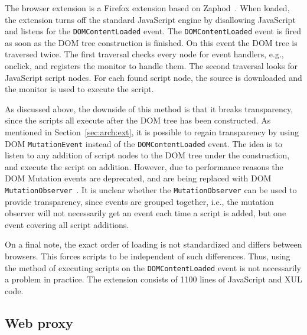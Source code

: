 \documentclass{llncs}
\begin{document}
The browser extension is a Firefox extension based on Zaphod~\cite{Zaphod}.
%
When loaded, the extension turns off the standard JavaScript engine by
disallowing JavaScript and listens for the \lstinline{DOMContentLoaded} event.  The
\lstinline{DOMContentLoaded} event is fired as soon as the DOM tree construction is
finished.  On this event the DOM tree is traversed twice. The first traversal
checks every node for event handlers, e.g., onclick, and registers the monitor
to handle them. The second traversal looks for JavaScript script nodes.  For
each found script node, the source is downloaded and the
monitor is used to execute the script.

As discussed above, the downside of this method is that it breaks
transparency, since the scripts all execute after the DOM
tree has been constructed. As mentioned in Section~\ref{sec:arch:ext}, it is possible to regain transparency by using DOM
\lstinline{MutationEvent} instead of the \lstinline{DOMContentLoaded} event.  The idea is to listen
to any addition of script nodes to the DOM tree under the construction, and
execute the script on addition.  However, due to performance reasons the DOM
Mutation events are deprecated, and are being replaced with DOM \lstinline{MutationObserver}~\cite{DOM4}. 
It is unclear whether the \lstinline{MutationObserver} can be used to
provide transparency, since events are grouped together, i.e., the mutation
observer will not necessarily get an event each time a script is added, but one
event covering all script additions.

On a final note, the exact order of loading is not standardized and differs between
browsers. This forces scripts to be independent of such differences. Thus,
using the method of executing scripts on the \lstinline{DOMContentLoaded} event is not
necessarily a problem in practice. 
%
The extension consists of 1100 lines of JavaScript and XUL code.




\subsection{Web proxy}

\end{document}
